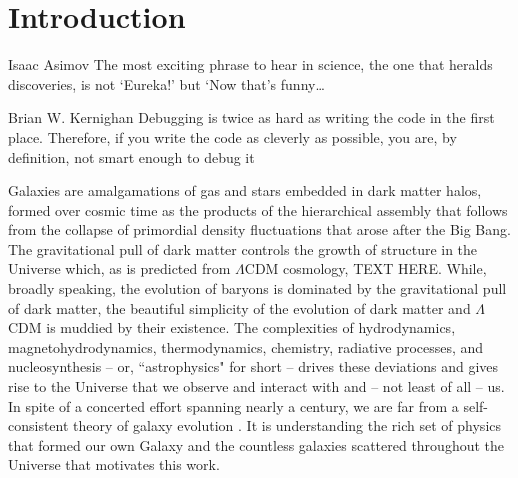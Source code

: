 \chapter[Introduction]{Introduction}
\label{ch:intro}
\vspace{-16pt} 
\begin{chapquote}{Isaac Asimov} \singlespacing The most exciting phrase to hear in science, the one that heralds discoveries, is not ‘Eureka!’ but ‘Now that’s funny…
\end{chapquote} \vspace{-8pt}
\begin{chapquote}{Brian W. Kernighan} \singlespacing Debugging is twice as hard as writing the code in the first place. Therefore, if you write the code as cleverly as possible, you are, by definition, not smart enough to debug it
\end{chapquote} \vspace{-8pt}

\noindent\makebox[\linewidth]{\rule{0.5\textwidth}{0.5pt}} \vspace{1pt}

\newcommand{\code}{\textsc}

%

Galaxies are amalgamations of gas and stars embedded in dark matter halos, formed over cosmic time as the products of the hierarchical assembly that follows from the collapse of primordial density fluctuations that arose after the Big Bang. The gravitational pull of dark matter controls the growth of structure in the Universe which, as is predicted from $\Lambda$CDM cosmology, TEXT HERE. While, broadly speaking, the evolution of baryons is dominated by the gravitational pull of dark matter, the beautiful simplicity of the evolution of dark matter and $\Lambda$CDM is muddied by their existence. The complexities of hydrodynamics, magnetohydrodynamics, thermodynamics, chemistry, radiative processes, and nucleosynthesis -- or, ``astrophysics" for short -- drives these deviations and gives rise to the Universe that we observe and interact with and -- not least of all -- us. In spite of a concerted effort spanning nearly a century, we are far from a self-consistent theory of galaxy evolution \citep[see ][ for a recent review of outstanding problems in galactic evolution]{NaabOstriker2017}. It is understanding the rich set of physics that formed our own Galaxy and the countless galaxies scattered throughout the Universe that motivates this work. 


